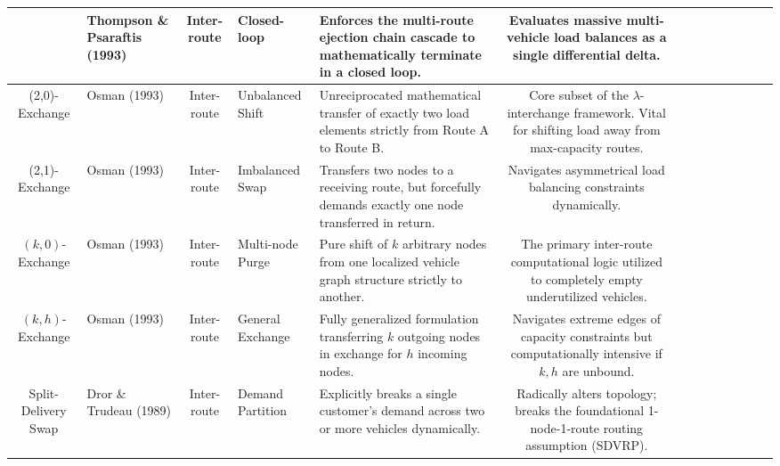 \documentclass[10pt, a4paper]{article}
\begin{document}
\begin{center}
\begin{longtable}
{Cyclic Transfer} & Thompson \& Psaraftis (1993)& Inter-route & Closed-loop & Enforces the multi-route ejection chain cascade to mathematically terminate in a closed loop. & Evaluates massive multi-vehicle load balances as a single differential delta. \\ \midrule
{(2,0)-Exchange} & Osman (1993) & Inter-route & Unbalanced Shift & Unreciprocated mathematical transfer of exactly two load elements strictly from Route A to Route B. & Core subset of the $\lambda$-interchange framework. Vital for shifting load away from max-capacity routes. \\ \midrule
{(2,1)-Exchange} & Osman (1993) & Inter-route & Imbalanced Swap & Transfers two nodes to a receiving route, but forcefully demands exactly one node transferred in return. & Navigates asymmetrical load balancing constraints dynamically. \\ \midrule
{$(k,0)$-Exchange} & Osman (1993) & Inter-route & Multi-node Purge & Pure shift of $k$ arbitrary nodes from one localized vehicle graph structure strictly to another. & The primary inter-route computational logic utilized to completely empty underutilized vehicles. \\ \midrule
{$(k,h)$-Exchange} & Osman (1993) & Inter-route & General Exchange & Fully generalized formulation transferring $k$ outgoing nodes in exchange for $h$ incoming nodes. & Navigates extreme edges of capacity constraints but computationally intensive if $k, h$ are unbound. \\ \midrule
{Split-Delivery Swap} & Dror \& Trudeau (1989) & Inter-route & Demand Partition & Explicitly breaks a single customer's demand across two or more vehicles dynamically. & Radically alters topology; breaks the foundational 1-node-1-route routing assumption (SDVRP). \\ \midrule


\end{longtable}
\end{center}
\end{document}
